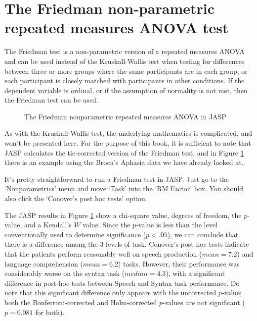 \section{The Friedman non-parametric repeated measures ANOVA test~\label{sec:Friedman}}

The Friedman test is a non-parametric version of a repeated measures ANOVA and can be used instead of the Kruskall-Wallis test when testing for differences between three or more groups where the same participants are in each group, or each participant is closely matched with participants in other conditions. If the dependent variable is ordinal, or if the assumption of normality is not met, then the Friedman test can be used. 

\vspace{0.5cm}
\begin{figure}[!ht]
\begin{center}
\caption{The Friedman nonparametric repeated measures ANOVA in JASP}
\HR
\label{fig:RManova6}
\end{center}
\end{figure}

As with the Kruskall-Wallis test, the underlying mathematics is complicated, and won't be presented here. For the purpose of this book, it is sufficient to note that JASP calculates the tie-corrected version of the Friedman test, and in Figure \ref{fig:RManova6} there is an example using the Broca's Aphasia data we have already looked at. 

It's pretty straightforward to run a Friedman test in JASP. Just go to the `Nonparametrics' menu and move `Task' into the `RM Factor' box.  You should also click the `Conover's post hoc tests' option.

The JASP results in Figure \ref{fig:RManova6} show a chi-square value, degrees of freedom, the $p$-value, and a Kendall's $W$ value. Since the $p$-value is less than the level conventionally used to determine significance ($p<.05$), we can conclude that there is a difference among the 3 levels of task. Conover's post hoc tests indicate that the patients perform reasonably well on speech production ($mean=7.2$) and language comprehension ($mean=6.2$) tasks. However, their performance was considerably worse on the syntax task ($median=4.3$), with a significant difference in post-hoc tests between Speech and Syntax task performance. Do note that this significant difference only appears with the uncorrected $p$-value; both the Bonferroni-corrected and Holm-corrected $p$-values are not significant ($p=0.081$ for both).


